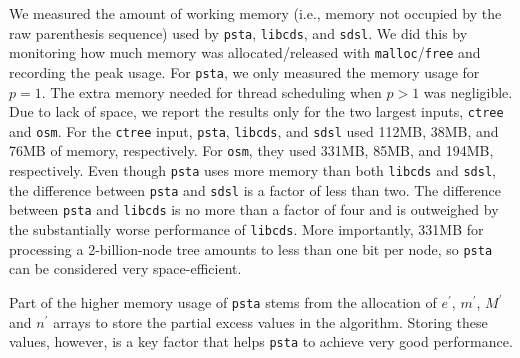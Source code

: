 We measured the amount of working memory (i.e., memory not occupied by the raw
parenthesis sequence) used by {\tt psta}, {\tt libcds}, and {\tt sdsl}.
We did this by monitoring how much memory was allocated/released with
\texttt{malloc}/\texttt{free} and recording the peak usage.
For {\tt psta}, we only measured the memory usage for $p = 1$.
The extra memory needed for thread scheduling when $p > 1$ was negligible.
Due to lack of space, we report the results only for the two largest inputs,
{\tt ctree} and {\tt osm}.
For the {\tt ctree} input, {\tt psta}, {\tt libcds}, and {\tt sdsl} used 112MB,
38MB, and 76MB of memory, respectively.
For {\tt osm}, they used 331MB, 85MB, and 194MB, respectively.
Even though {\tt psta} uses more memory than both {\tt libcds} and {\tt sdsl},
the difference between {\tt psta} and {\tt sdsl} is a factor of less than two.
The difference between {\tt psta} and {\tt libcds} is no more than a factor of
four and is outweighed by the substantially worse performance of {\tt libcds}.
More importantly, 331MB for processing a 2-billion-node tree amounts to less
than one bit per node, so {\tt psta} can be considered very space-efficient.

Part of the higher memory usage of {\tt psta} stems from the allocation of
$e^{\prime}$, $m^{\prime}$, $M^{\prime}$ and $n^{\prime}$ arrays to store the
partial excess values in the algorithm.
Storing these values, however, is a key factor that helps {\tt psta} to achieve
very good performance.
